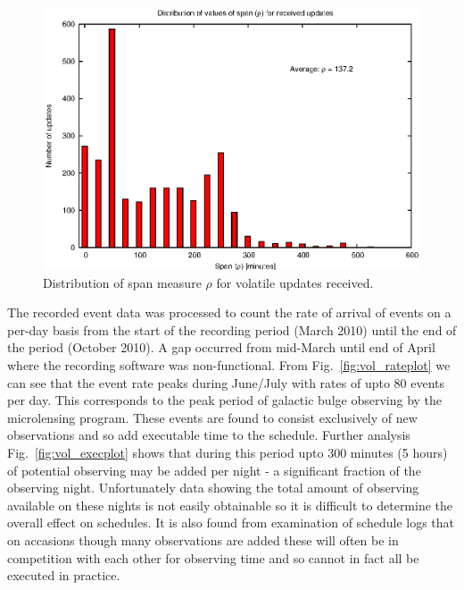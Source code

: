 \begin{figure}[htbp]
\begin{center}
    \includegraphics[scale=1.0, angle=0]{figures/vol_span.eps}
\end{center}
\caption[Distribution of span measure $\rho$ for volatile updates received.]
{Distribution of span measure $\rho$ for volatile updates received.}
\label{fig:vol_spandist}
\end{figure}


The recorded event data was processed to count the rate of arrival of events on a per-day basis from the start of the recording period (March 2010) until the end of the period (October 2010). A gap occurred from mid-March until end of April where the recording software was non-functional. From Fig.~\ref{fig:vol_rateplot} we can see that the event rate peaks during June/July with rates of upto 80 events per day. This corresponds to the peak period of galactic bulge observing by the microlensing program. These events are found to consist exclusively of new observations and so add executable time to the schedule. Further analysis Fig.~\ref{fig:vol_execplot} shows that during this period upto 300 minutes (5 hours) of potential observing may be added per night - a significant fraction of the observing night. Unfortunately data showing the total amount of observing available on these nights is not easily obtainable so it is difficult to determine the overall effect on schedules. It is also found from examination of schedule logs that on accasions though many observations are added these will often be in competition with each other for observing time and so cannot in fact all be executed in practice.


